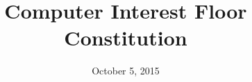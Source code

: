 \documentclass[12pt]{article}
\title{Computer Interest Floor Constitution}
\date{October 5, 2015}
\begin{document}
\maketitle
\tableofcontents

\pagebreak











\end{document}
